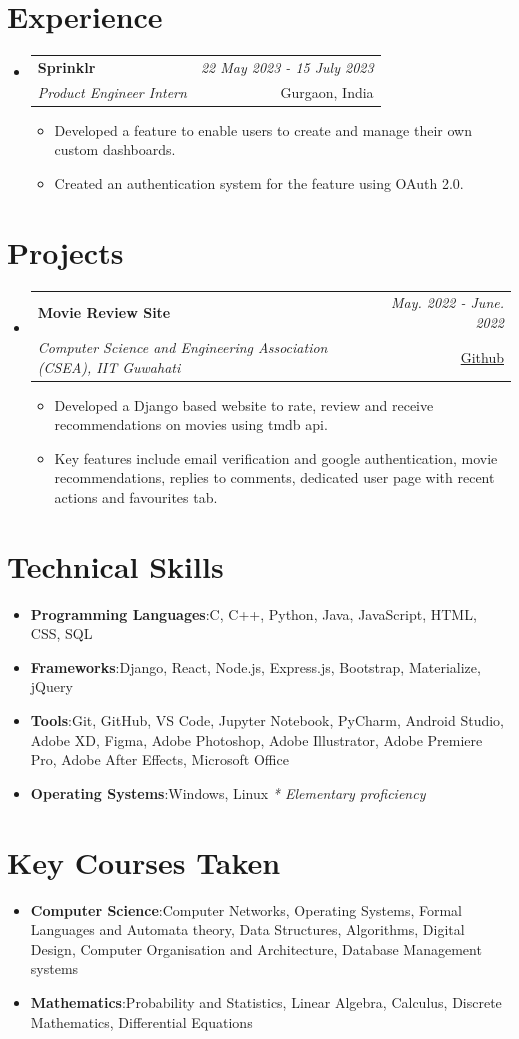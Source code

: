 \documentclass[a4paper,11pt]{article}
\makeatletter
\newcommand{\resumeItem}[2]{
  \item{
    \textbf{#1}{:\hspace{0.5mm}#2 \vspace{-0.5mm}}
  }
}
\newcommand{\resumeSubheading}[4]{
\vspace{0.5mm}\item
    \begin{tabular*}{0.98\textwidth}[t]{l@{\extracolsep{\fill}}r}
        \textbf{#1} & \textit{\footnotesize{#4}} \\
        \textit{\footnotesize{#3}} &  \footnotesize{#2}\\
    \end{tabular*}
    \vspace{-2.4mm}
}
\newcommand{\resumeProject}[4]{
\vspace{0.5mm}\item
    \begin{tabular*}{0.98\textwidth}[t]{l@{\extracolsep{\fill}}r}
        \textbf{#1} & \textit{\footnotesize{#3}} \\
        \footnotesize{\textit{#2}} & \footnotesize{#4}
    \end{tabular*}
    \vspace{-2.4mm}
}
\newcommand{\resumeSubItem}[2]{\resumeItem{#1}{#2}\vspace{-4pt}}
\newcommand{\resumeSubHeadingListStart}{\begin{itemize}[leftmargin=*,labelsep=0mm]}
\newcommand{\resumeHeadingSkillStart}{\begin{itemize}[leftmargin=*,itemsep=1.7mm, rightmargin=2ex]}
\newcommand{\resumeItemListStart}{\begin{justify}\begin{itemize}[leftmargin=3ex, rightmargin=2ex, noitemsep,labelsep=1.2mm,itemsep=0mm]\small}
\newcommand{\resumeSubHeadingListEnd}{\end{itemize}\vspace{2mm}}
\newcommand{\resumeHeadingSkillEnd}{\end{itemize}\vspace{-2mm}}
\newcommand{\resumeItemListEnd}{\end{itemize}\end{justify}\vspace{-2mm}}
\makeatother
\begin{document}
\section{Experience}
  \resumeSubHeadingListStart

\resumeSubheading
{Sprinklr}{Gurgaon, India}
{Product Engineer Intern}{22 May 2023 - 15 July 2023}
\resumeItemListStart
\item{                Developed a feature to enable users to create and manage their own custom dashboards.}
\item{                Created an authentication system for the feature using OAuth 2.0.}
\resumeItemListEnd
\resumeSubHeadingListEnd
\vspace{-5.5mm}
\section{Projects}
\resumeSubHeadingListStart
    
\resumeProject
{Movie Review Site}
{Computer Science and Engineering Association (CSEA), IIT Guwahati}
{May. 2022 - June. 2022}
{\href{https://github.com/Pranjal-g083/Boomorev}{Github}}
\resumeItemListStart
\item{            Developed a Django based website to rate, review and receive recommendations on movies using tmdb api.}
\item{            Key features include email verification and google authentication, movie recommendations, replies to comments, dedicated user page with recent actions and favourites tab.}
\resumeItemListEnd
\resumeSubHeadingListEnd
\vspace{-5.5mm}
\section{Technical Skills}
 \resumeHeadingSkillStart
\resumeSubItem{Programming Languages}
{C, C++, Python, Java, JavaScript, HTML, CSS, SQL}
\resumeSubItem{Frameworks}
{Django, React, Node.js, Express.js, Bootstrap, Materialize, jQuery}
\resumeSubItem{Tools}
{Git, GitHub, VS Code, Jupyter Notebook, PyCharm, Android Studio, Adobe XD, Figma, Adobe Photoshop, Adobe Illustrator, Adobe Premiere Pro, Adobe After Effects, Microsoft Office}
\resumeSubItem{Operating Systems}
{Windows, Linux}
\hfill \textit{\footnotesize{* Elementary proficiency}} \hspace{3mm}
 \resumeHeadingSkillEnd
\section{Key Courses Taken}
 \resumeHeadingSkillStart
 \resumeSubItem{Computer Science}
{Computer Networks, Operating Systems, Formal Languages and Automata theory, Data Structures, Algorithms, Digital Design, Computer Organisation and Architecture, Database Management systems}
 \resumeSubItem{Mathematics}
{Probability and Statistics, Linear Algebra, Calculus, Discrete Mathematics, Differential Equations}
 \resumeHeadingSkillEnd
\end{document}
